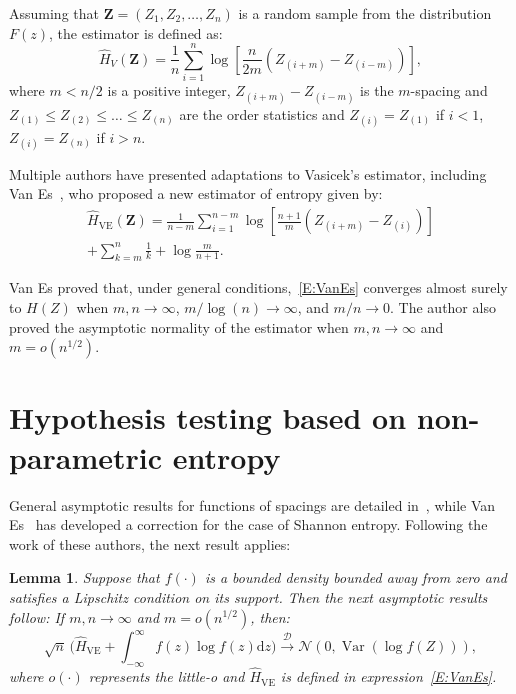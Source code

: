 \documentclass[conference]{IEEEtran}
\newtheorem{lemma}{Lemma}
\begin{document}
{Assuming that  $\bm{Z}=(Z_1, Z_2, \ldots,Z_n)$ is a random sample from the distribution $F(z)$, the estimator is defined as:
\begin{equation*}
	\widehat{H}_{V}(\bm{Z})=\frac{1}{n}\sum_{i=1}^{n}\log\left[\frac{n}{2m}\left(Z_{(i+m)}-Z_{(i-m)}\right)\right],
	\end{equation*}
where $m<n/2$ is a positive integer, $Z_{(i+m)}-Z_{(i-m)}$ is the $m$-spacing and $Z_{(1)}\leq Z_{(2)}\leq\ldots\leq Z_{(n)}$ are the order statistics and $Z_{(i)}= Z_{(1)}$ if $i<1$, $Z_{(i)}= Z_{(n)}$ if $i>n$.

Multiple authors have presented  adaptations to Vasicek's estimator, including Van Es~\cite{Bert1992}, who proposed a new estimator of entropy given by:
\begin{multline}
\label{E:VanEs}
	\widehat{H}_{\text{VE}}(\bm{Z})=\frac{1}{n-m}\sum_{i=1}^{n-m}\log\left[\frac{n+1}{m}\left(Z_{(i+m)}-Z_{(i)}\right)\right]\\
	+\sum_{k=m}^n\frac{1}{k}+\log\frac{m}{n+1}.
\end{multline}

Van Es proved that, under general conditions,~\eqref{E:VanEs} converges almost surely to $H(Z)$ when $m, n\rightarrow\infty$,  $m/ \log(n)\rightarrow\infty$, and $m/n \rightarrow0$.
The author also proved the asymptotic normality of the estimator when $m, n\rightarrow\infty$ and $m=o(n^{1/2})$.
\section{Hypothesis testing based on non-parametric entropy}

General asymptotic results for functions of spacings are detailed in~\cite{Khashimov1990}, while Van Es~\cite{Bert1992} has developed a correction for the case of Shannon entropy.
Following the work of these authors, the next result applies: 

\begin{lemma}
Suppose that $f(\cdot)$ is a bounded density bounded away from zero and satisfies a Lipschitz condition on its support.
Then the next asymptotic results follow: If $m,n\rightarrow \infty$ and $m=o(n^{1/2})$, then:
$$
\sqrt{n}\,\Big(\widehat{H}_{\text{VE}}+\int_{-\infty}^\infty f(z)\log f(z) \mathrm{d}z\Big)
\xrightarrow[]{\mathcal{D}}
\mathcal{N}(0,\operatorname{Var}(\log f(Z))),
$$
where $o(\cdot)$ represents the little-o and $\widehat{H}_{\text{VE}}$ is defined in expression~\eqref{E:VanEs}.

\end{lemma} 


}
\end{document}
